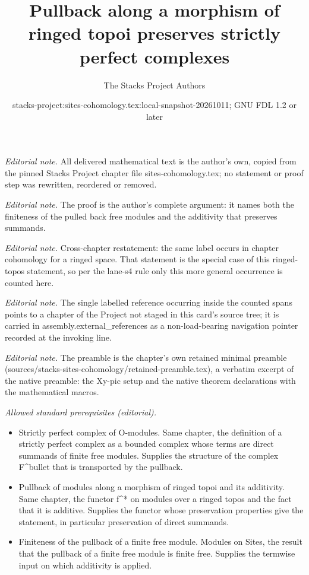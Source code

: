 \documentclass[10pt,a4paper]{amsart}
\title{Pullback along a morphism of ringed topoi preserves strictly perfect complexes}
\author{The Stacks Project Authors}
\date{stacks-project:sites-cohomology.tex:local-snapshot-20261011; GNU FDL 1.2 or later}
\theoremstyle{plain}
\theoremstyle{definition}
\theoremstyle{remark}
\numberwithin{equation}{subsection}
\begin{document}
\maketitle
\noindent\textit{Editorial note.} All delivered mathematical text is the author's own, copied from the pinned Stacks Project chapter file sites-cohomology.tex; no statement or proof step was rewritten, reordered or removed.\par\medskip
\noindent\textit{Editorial note.} The proof is the author's complete argument: it names both the finiteness of the pulled back free modules and the additivity that preserves summands.\par\medskip
\noindent\textit{Editorial note.} Cross-chapter restatement: the same label occurs in chapter cohomology for a ringed space. That statement is the special case of this ringed-topos statement, so per the lane-s4 rule only this more general occurrence is counted here.\par\medskip
\noindent\textit{Editorial note.} The single labelled reference occurring inside the counted spans points to a chapter of the Project not staged in this card's source tree; it is carried in assembly.external\_references as a non-load-bearing navigation pointer recorded at the invoking line.\par\medskip
\noindent\textit{Editorial note.} The preamble is the chapter's own retained minimal preamble (sources/stacks-sites-cohomology/retained-preamble.tex), a verbatim excerpt of the native preamble: the Xy-pic setup and the native theorem declarations with the mathematical macros.\par\medskip
\noindent\textit{Allowed standard prerequisites (editorial).}\begin{itemize}
\item Strictly perfect complex of O-modules. Same chapter, the definition of a strictly perfect complex as a bounded complex whose terms are direct summands of finite free modules. Supplies the structure of the complex F\textasciicircum{}bullet that is transported by the pullback.
\item Pullback of modules along a morphism of ringed topoi and its additivity. Same chapter, the functor f\textasciicircum{}* on modules over a ringed topos and the fact that it is additive. Supplies the functor whose preservation properties give the statement, in particular preservation of direct summands.
\item Finiteness of the pullback of a finite free module. Modules on Sites, the result that the pullback of a finite free module is finite free. Supplies the termwise input on which additivity is applied.
\end{itemize}\medskip
\end{document}

